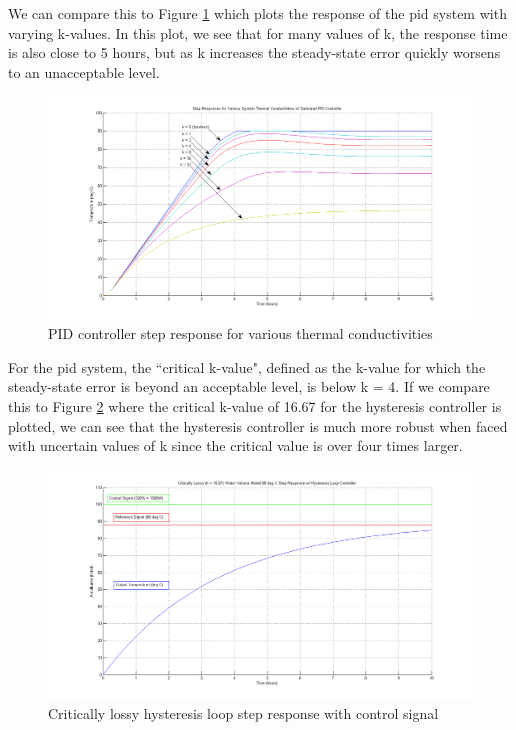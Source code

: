 \documentclass{article}
\begin{document}
We can compare this to Figure \ref{fig:pid-steps-various-k} which plots the response of the \gls{pid} system with varying k-values. In this plot, we see that for many values of k, the response time is also close to 5 hours, but as k increases the steady-state error quickly worsens to an unacceptable level.

\begin{figure}[H]
\begin{center}
\includegraphics[scale=0.30]{pid-steps-various-k.png}
\caption{PID controller step response for various thermal conductivities}
\label{fig:pid-steps-various-k}
\end{center}
\end{figure}

For the \gls{pid} system, the ``critical k-value", defined as the k-value for which the steady-state error is beyond an acceptable level, is below k = 4. If we compare this to Figure \ref{fig:hysteresis-step-critical} where the critical k-value of 16.67 for the hysteresis controller is plotted, we can see that the hysteresis controller is much more robust when faced with uncertain values of k since the critical value is over four times larger.

\begin{figure}[H]
\begin{center}
\includegraphics[scale=0.30]{hysteresis-step-critical.png}
\caption{Critically lossy hysteresis loop step response with control signal}
\label{fig:hysteresis-step-critical}
\end{center}
\end{figure}
\end{document}
